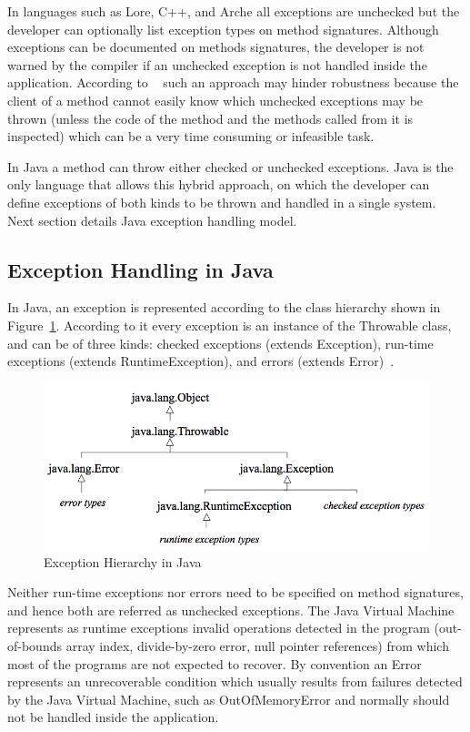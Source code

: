 \documentclass[conference]{IEEEtran}
\begin{document}
In languages such as Lore, C++, and Arche all exceptions are unchecked but the developer can optionally list exception types on method signatures. Although exceptions can 
be documented on methods signatures, the developer is not warned by the compiler
if an unchecked exception is not handled inside the application. According to ~\cite{Robil00} 
such an approach may hinder robustness because the client of a method cannot easily know
which unchecked exceptions may be thrown (unless the code of the method and the
methods called from it is inspected) which can be a very time consuming or
infeasible task. 

In Java a method can throw either checked or unchecked exceptions. Java is the only language that allows this hybrid approach, on which the developer can define exceptions of both kinds to be thrown and
handled in a single system. Next section details Java exception handling model.

\subsection{Exception Handling in Java} \label{sec:extypes}

In Java, an exception is represented according to the class hierarchy shown in
Figure~\ref{fig:exchier}.  According to it every exception is an
instance of the Throwable class, and can be of three kinds: checked exceptions
(extends Exception), run-time exceptions (extends RuntimeException), and errors
(extends Error)~\cite{gosling2000java}.

\begin{figure} \centering \includegraphics[width=\hsize]{new2_hierarchy.png}
  \caption{Exception Hierarchy in Java} \label{fig:exchier} \end{figure}

Neither run-time exceptions nor errors need to be specified on method
signatures, and hence both are referred as unchecked exceptions. The Java
Virtual Machine represents as runtime exceptions invalid operations detected in
the program (out-of-bounds array index, divide-by-zero error, null pointer
references) from which most of the programs are not expected to recover. By
convention an Error represents an unrecoverable condition which usually results
from failures detected by the Java Virtual Machine, such as OutOfMemoryError and
normally should not be handled inside the application.
\end{document}
